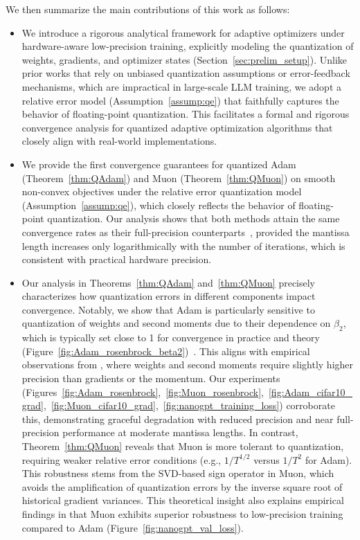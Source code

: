 \documentclass[11pt, letterpaper]{article}
\begin{document}
We then summarize the main contributions of this work  as follows:
\begin{itemize}[leftmargin=*]
    \item We introduce a rigorous analytical framework for adaptive optimizers under hardware-aware low-precision training, explicitly modeling the quantization of weights, gradients, and optimizer states (Section~\ref{sec:prelim_setup}). Unlike prior works that rely on unbiased quantization assumptions or error-feedback mechanisms, which are impractical in large-scale LLM training, we adopt a relative error model (Assumption~\ref{assump:qe}) that faithfully captures the behavior of floating-point quantization. This facilitates a formal and rigorous convergence analysis for quantized adaptive optimization algorithms that closely align with real-world implementations.
    \item We provide the first convergence guarantees for quantized Adam (Theorem~\ref{thm:QAdam}) and Muon (Theorem~\ref{thm:QMuon}) on smooth non-convex objectives under the relative error quantization model (Assumption~\ref{assump:qe}), which closely reflects the behavior of floating-point quantization. Our analysis shows that both methods attain the same convergence rates as their full-precision counterparts~\citep{defossez2022a,shen2025convergence}, provided the mantissa length increases only logarithmically with the number of iterations, which is consistent with practical hardware precision.
    \item Our analysis in Theorems~\ref{thm:QAdam} and~\ref{thm:QMuon} precisely characterizes how quantization errors in different components impact convergence.  
    Notably, we show that Adam is particularly sensitive to quantization of weights and second moments due to their dependence on $\beta_2$, which is typically set close to 1 for convergence in practice and theory (Figure~\ref{fig:Adam_rosenbrock_beta2})~\citep{zhang2022adam}. This aligns with empirical observations from \citet{peng2023fp8,tao2024collage}, where weights and second moments require slightly higher precision than gradients or the momentum. Our experiments (Figures~\ref{fig:Adam_rosenbrock},~\ref{fig:Muon_rosenbrock},~\ref{fig:Adam_cifar10_grad},~\ref{fig:Muon_cifar10_grad},~\ref{fig:nanogpt_training_loss}) corroborate this, demonstrating graceful degradation with reduced precision and near full-precision performance at moderate mantissa lengths. In contrast, Theorem~\ref{thm:QMuon} reveals that Muon is more tolerant to quantization, requiring weaker relative error conditions (e.g., $1/T^{1/2}$ versus $1/T^2$ for Adam). This robustness stems from the SVD-based sign operator in Muon, which avoids the amplification of quantization errors by the inverse square root of historical gradient variances. This theoretical insight also explains empirical findings in \citet{liu2025muon} that Muon exhibits superior robustness to low-precision training compared to Adam (Figure~\ref{fig:nanogpt_val_loss}).
\end{itemize}
\end{document}
